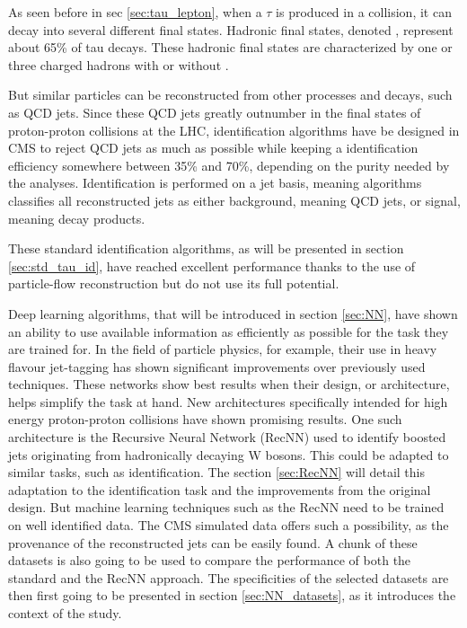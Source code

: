 
As seen before in sec \ref{sec:tau_lepton}, when a $\tau$ is produced in a collision, it can decay into several different final states.
Hadronic final states, denoted \tauh, represent about 65\% of tau decays.
These hadronic final states are characterized by one or three charged hadrons with or without \pizero .

But similar particles can be reconstructed from other processes and decays, such as QCD jets.
Since these QCD jets greatly outnumber \tauh in the final states of proton-proton collisions at the LHC, \tauh identification algorithms have be designed in CMS to reject QCD jets as much as possible while keeping a \tauh identification efficiency somewhere between 35\% and 70\%, depending on the purity needed by the analyses. Identification is performed on a jet basis, meaning algorithms classifies all reconstructed jets as either background, meaning QCD jets, or signal, meaning \tauh decay products.

These standard \tauh identification algorithms, as will be presented in section \ref{sec:std_tau_id}, have reached excellent performance thanks to the use of particle-flow reconstruction but do not use its full potential.

Deep learning algorithms, that will be introduced in section \ref{sec:NN}, have shown an ability to use available information as efficiently as possible for the task they are trained for. In the field of particle physics, for example, their use in heavy flavour jet-tagging \cite{btagging_NN} has shown significant improvements over previously used techniques. These networks show best results when their design, or architecture, helps simplify the task at hand. New architectures specifically intended for high energy proton-proton collisions have shown promising results. One such architecture is the Recursive Neural Network (RecNN) \cite{Louppe:2017ipp} used to identify boosted jets originating from hadronically decaying W bosons. This could be adapted to similar tasks, such as \tauh identification. The section \ref{sec:RecNN} will detail this adaptation to the \tauh identification task and the improvements from the original design. But machine learning techniques such as the RecNN need to be trained on well identified data. The CMS simulated data offers such a possibility, as the provenance of the reconstructed jets can be easily found. A chunk of these datasets is also going to be used to compare the performance of both the standard and the RecNN approach. The specificities of the selected datasets are then first going to be presented in section \ref{sec:NN_datasets}, as it introduces the context of the study.

